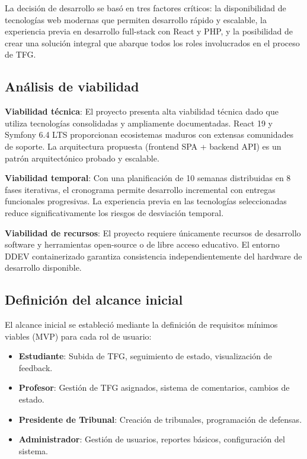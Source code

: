 \documentclass[12pt,a4paper,oneside]{report}
\providecommand{\tightlist}{%
  \setlength{\itemsep}{0pt}\setlength{\parskip}{0pt}}
\begin{document}
La decisión de desarrollo se basó en tres factores críticos: la
disponibilidad de tecnologías web modernas que permiten desarrollo
rápido y escalable, la experiencia previa en desarrollo full-stack con
React y PHP, y la posibilidad de crear una solución integral que abarque
todos los roles involucrados en el proceso de TFG.

\subsection{Análisis de viabilidad}\label{anuxe1lisis-de-viabilidad}

\textbf{Viabilidad técnica}: El proyecto presenta alta viabilidad
técnica dado que utiliza tecnologías consolidadas y ampliamente
documentadas. React 19 y Symfony 6.4 LTS proporcionan ecosistemas
maduros con extensas comunidades de soporte. La arquitectura propuesta
(frontend SPA + backend API) es un patrón arquitectónico probado y
escalable.

\textbf{Viabilidad temporal}: Con una planificación de 10 semanas
distribuidas en 8 fases iterativas, el cronograma permite desarrollo
incremental con entregas funcionales progresivas. La experiencia previa
en las tecnologías seleccionadas reduce significativamente los riesgos
de desviación temporal.

\textbf{Viabilidad de recursos}: El proyecto requiere únicamente
recursos de desarrollo software y herramientas open-source o de libre
acceso educativo. El entorno DDEV containerizado garantiza consistencia
independientemente del hardware de desarrollo disponible.

\subsection{Definición del alcance
inicial}\label{definiciuxf3n-del-alcance-inicial}

El alcance inicial se estableció mediante la definición de requisitos
mínimos viables (MVP) para cada rol de usuario:

\begin{itemize}
\tightlist
\item
  \textbf{Estudiante}: Subida de TFG, seguimiento de estado,
  visualización de feedback.
\item
  \textbf{Profesor}: Gestión de TFG asignados, sistema de comentarios,
  cambios de estado.
\item
  \textbf{Presidente de Tribunal}: Creación de tribunales, programación
  de defensas.
\item
  \textbf{Administrador}: Gestión de usuarios, reportes básicos,
  configuración del sistema.
\end{itemize}
\end{document}
